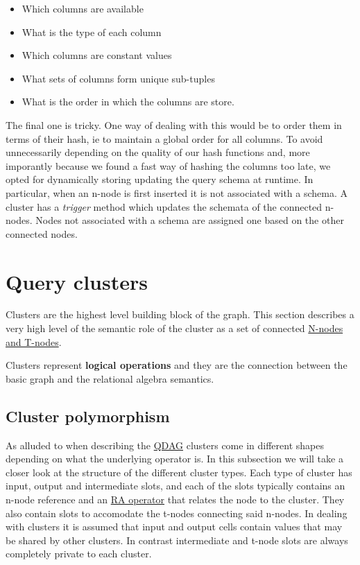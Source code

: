 \begin{itemize}
\item Which columns are available
\item What is the type of each column
\item Which columns are constant values
\item What sets of columns form unique sub-tuples
\item What is the order in which the columns are store.
\end{itemize}

The final one is tricky. One way of dealing with this would be to
order them in terms of their hash, ie to maintain a global order
for all columns. To avoid unnecessarily depending on the quality of
our hash functions and, more imporantly because we found a fast way
of hashing the columns too late, we opted for dynamically storing
updating the query schema at runtime. In particular, when an n-node
is first inserted it is not associated with a schema. A cluster has
a \emph{trigger} method which updates the schemata of the connected
n-nodes. Nodes not associated with a schema are assigned one based
on the other connected nodes.




\section{Query clusters}
\label{sec:org6e4b098}
Clusters are the highest level building block of the graph. This
section describes a very high level of the semantic role of the
cluster as a set of connected \hyperref[sec:org5a9ec3b]{N-nodes and T-nodes}.

Clusters represent \textbf{logical operations} and they are the connection
between the basic graph and the relational algebra semantics.

\subsection{Cluster polymorphism}
\label{sec:orgadee761}
As alluded to when describing the \hyperref[sec:org5a9ec3b]{QDAG}
clusters come in different shapes depending on what the underlying
operator is. In this subsection we will take a closer look at the
structure of the different cluster types. Each type of cluster has
input, output and intermediate slots, and each of the slots typically
contains an n-node reference and an
\hyperref[sec:relational_algebra_semantics]{RA operator} that relates
the node to the cluster. They also contain slots to accomodate the
t-nodes connecting said n-nodes. In dealing with clusters it is
assumed that input and output cells contain values that may be shared
by other clusters. In contrast intermediate and t-node slots are
always completely private to each cluster.

